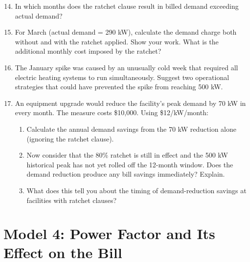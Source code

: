 \documentclass[./main.tex]{subfiles}
\begin{document}
\begin{enumerate}
  \setcounter{enumi}{13}
  \item In which months does the ratchet clause result in billed demand
        exceeding actual demand?
        \vspace{1.25in}

  \item For March (actual demand = 290 kW), calculate the demand charge both
        without and with the ratchet applied. Show your work. What is the
        additional monthly cost imposed by the ratchet?
        \vspace{1.25in}

  \item The January spike was caused by an unusually cold week that required
        all electric heating systems to run simultaneously. Suggest two
        operational strategies that could have prevented the spike from
        reaching 500 kW.
        \vspace{1.25in}

  \item An equipment upgrade would reduce the facility's peak demand by 70 kW
        in every month. The measure costs \$10,000. Using \$12/kW/month:
        \begin{enumerate}
          \item Calculate the annual demand savings from the 70 kW reduction
                alone (ignoring the ratchet clause).
                \vspace{1.25in}
          \item Now consider that the 80\% ratchet is still in effect and the
                500 kW historical peak has not yet rolled off the 12-month
                window. Does the demand reduction produce any bill savings
                immediately? Explain.
                \vspace{1.25in}
          \item What does this tell you about the timing of demand-reduction
                savings at facilities with ratchet clauses?
                \vspace{1.25in}
        \end{enumerate}
\end{enumerate}

\clearpage
\section*{Model 4: Power Factor and Its Effect on the Bill}
\end{document}

